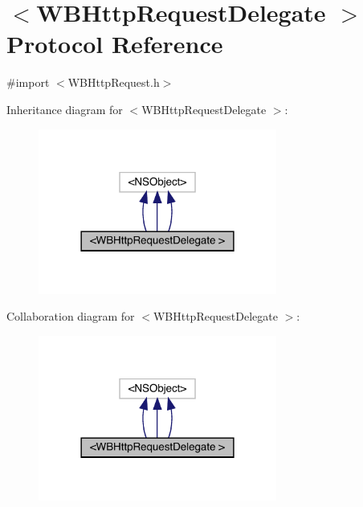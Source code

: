 \hypertarget{protocol_w_b_http_request_delegate_01-p}{}\section{$<$W\+B\+Http\+Request\+Delegate $>$ Protocol Reference}
\label{protocol_w_b_http_request_delegate_01-p}


{\ttfamily \#import $<$W\+B\+Http\+Request.\+h$>$}



Inheritance diagram for $<$W\+B\+Http\+Request\+Delegate $>$\+:\nopagebreak
\begin{figure}[H]
\begin{center}
\leavevmode
\includegraphics[width=222pt]{protocol_w_b_http_request_delegate_01-p__inherit__graph}
\end{center}
\end{figure}


Collaboration diagram for $<$W\+B\+Http\+Request\+Delegate $>$\+:\nopagebreak
\begin{figure}[H]
\begin{center}
\leavevmode
\includegraphics[width=222pt]{protocol_w_b_http_request_delegate_01-p__coll__graph}
\end{center}
\end{figure}
